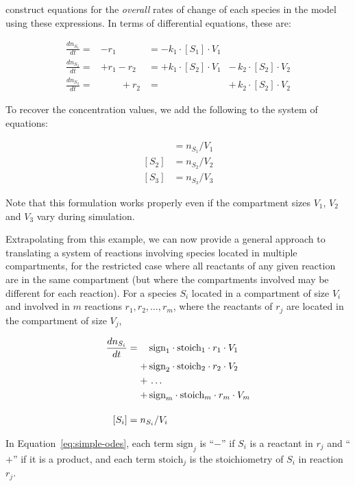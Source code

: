 construct equations for the \emph{overall} rates of change of each
species in the model using these expressions.  In terms of
differential equations, these are:
\begin{linenomath}
\begin{equation*}
  \begin{aligned}
  \frac{dn_{S_1}}{dt} = &- r_1                    &= - k_1 \cdot [S_1] \cdot V_1 &{}\\[4pt]
  \frac{dn_{S_2}}{dt} = &+ r_1 - r_2              &= + k_1 \cdot [S_2] \cdot V_1 &-\, k_2 \cdot [S_2] \cdot V_2\\[4pt]
  \frac{dn_{S_3}}{dt} = &\phantom{{}+ r_1} + r_2  &= \phantom{+ k_1 \cdot [S_2] \cdot V_1} &+\, k_2 \cdot [S_2] \cdot V_2
\end{aligned}
\end{equation*}
\end{linenomath}
To recover the concentration values, we add the following to the
system of equations:
\begin{linenomath}
\begin{align*}
  [S_1] &= n_{S_1}/V_1\\
  [S_2] &= n_{S_2}/V_2\\
  [S_3] &= n_{S_3}/V_3
\end{align*}
\end{linenomath}
Note that this formulation works properly even if the compartment
sizes $V_1$, $V_2$ and $V_3$ vary during simulation.  

Extrapolating from this example, we can now provide a general
approach to translating a system of reactions involving species
located in multiple compartments, for the restricted case where
all reactants of any given reaction are in the same compartment
(but where the compartments involved may be different for each
reaction).  For a species $S_i$ located in a compartment of size
$V_i$ and involved in $m$ reactions $r_1, r_2, \ldots, r_m$, where
the reactants of $r_j$ are located in the compartment of size
$V_j$,
\begin{linenomath}
\begin{equation} \label{eq:simple-odes}
  \begin{split}
    \frac{dn_{S_i}}{dt} &= \relphantom{+}\,\text{sign}_1 \cdot \text{stoich}_1 \cdot r_1 \cdot V_1\\
    &\relphantom{=} +\, \text{sign}_2 \cdot \text{stoich}_2 \cdot r_2 \cdot V_2\\
    &\relphantom{=} +\, \ldots \\
    &\relphantom{=} +\, \text{sign}_m \cdot \text{stoich}_m \cdot r_m \cdot V_m\\
    \\[-4pt]
    [S_i] &= n_{S_i}/V_i
  \end{split}
\end{equation}
\end{linenomath}
In Equation~\eqref{eq:simple-odes}, each term $\text{sign}_j$ is
``$-$'' if $S_i$ is a reactant in $r_j$ and ``$+$'' if it is a
product, and each term $\text{stoich}_j$ is the stoichiometry of
$S_i$ in reaction $r_j$.

